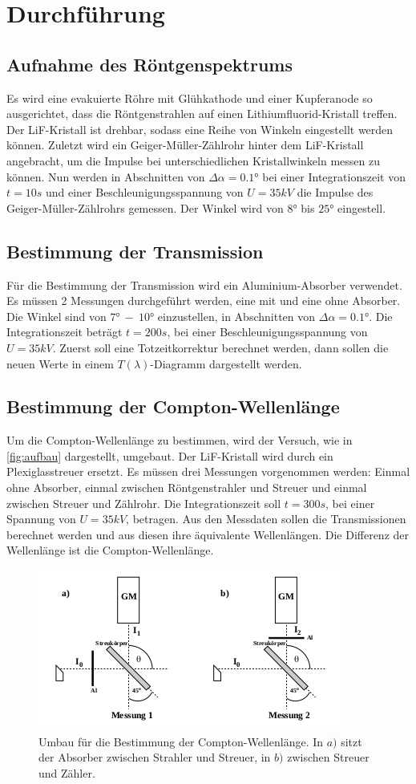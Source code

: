 \section{Durchführung}
\label{sec:Durchführung}

\subsection{Aufnahme des Röntgenspektrums}

Es wird eine evakuierte Röhre mit Glühkathode und einer Kupferanode so ausgerichtet, dass die Röntgenstrahlen auf einen Lithiumfluorid-Kristall treffen.
Der LiF-Kristall ist drehbar, sodass eine Reihe von Winkeln eingestellt werden können.
Zuletzt wird ein Geiger-Müller-Zählrohr hinter dem LiF-Kristall angebracht, um die Impulse bei unterschiedlichen Kristallwinkeln messen zu können.
Nun werden in Abschnitten von $\Delta \alpha = 0.1°$ bei einer Integrationszeit von $t = 10s$ und einer Beschleunigungsspannung von $U = 35kV$ die Impulse des Geiger-Müller-Zählrohrs gemessen.
Der Winkel wird von $8°$ bis $25°$ eingestell.

\subsection{Bestimmung der Transmission}

Für die Bestimmung der Transmission wird ein Aluminium-Absorber verwendet.
Es müssen 2 Messungen durchgeführt werden, eine mit und eine ohne Absorber.
Die Winkel sind von $7°\ -\ 10°$ einzustellen, in Abschnitten von $\Delta \alpha = 0.1°$.
Die Integrationszeit beträgt $t = 200s$, bei einer Beschleunigungsspannung von $U = 35kV$.
Zuerst soll eine Totzeitkorrektur berechnet werden, dann sollen die neuen Werte in einem $T(\lambda)$-Diagramm dargestellt werden.

\subsection{Bestimmung der Compton-Wellenlänge}

Um die Compton-Wellenlänge zu bestimmen, wird der Versuch, wie in \autoref{fig:aufbau} dargestellt, umgebaut.
Der LiF-Kristall wird durch ein Plexiglasstreuer ersetzt.
Es müssen drei Messungen vorgenommen werden: Einmal ohne Absorber, einmal zwischen Röntgenstrahler und Streuer und einmal zwischen Streuer und Zählrohr.
Die Integrationszeit soll $t = 300s$, bei einer Spannung von $U = 35kV$, betragen.
Aus den Messdaten sollen die Transmissionen berechnet werden und aus diesen ihre äquivalente Wellenlängen.
Die Differenz der Wellenlänge ist die Compton-Wellenlänge.

\begin{figure}[htbp]
    \centering
    \includegraphics{content/Aufbau_Compton.png}
    \caption{Umbau für die Bestimmung der Compton-Wellenlänge. In $a)$ sitzt der Absorber zwischen Strahler und Streuer, in $b)$ zwischen Streuer und Zähler.}
    \label{fig:aufbau}
\end{figure}